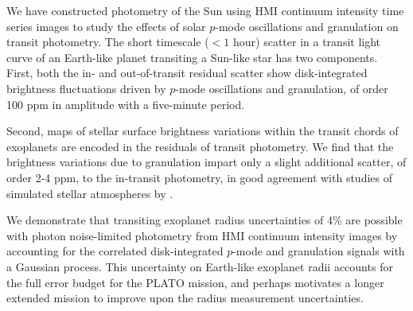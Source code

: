 We have constructed photometry of the Sun using HMI continuum intensity time series images to study the effects of solar $p$-mode oscillations and granulation on transit photometry. The short timescale ($<1$ hour) scatter in a transit light curve of an Earth-like planet transiting a Sun-like star has two components. First, both the in- and out-of-transit residual scatter show disk-integrated brightness fluctuations driven by $p$-mode oscillations and granulation, of order 100 ppm in amplitude with a five-minute period. 

Second, maps of stellar surface brightness variations within the transit chords of exoplanets are encoded in the residuals of transit photometry. We find that the brightness variations due to granulation impart only a slight additional scatter, of order 2-4 ppm, to the in-transit photometry, in good agreement with studies of simulated stellar atmospheres by \citet{Chiavassa2017}.

We demonstrate that transiting exoplanet radius uncertainties of 4\% are possible with photon noise-limited photometry from HMI continuum intensity images by accounting for the correlated disk-integrated $p$-mode and granulation signals with a Gaussian process. This uncertainty on Earth-like exoplanet radii accounts for the full error budget for the PLATO mission, and perhaps motivates a longer extended mission to improve upon the radius measurement uncertainties. 
%
%
%
%
%
%

